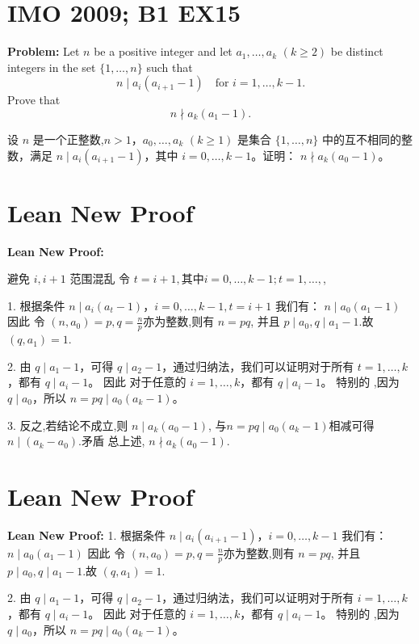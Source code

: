 \documentclass[a4paper]{article}
\begin{document}
\section*{IMO 2009; B1 EX15}
    \textbf{Problem:}
    Let $n$ be a positive integer and let $a_1,\ldots,a_k$ $(k \geq 2)$ be distinct integers in the set $\{1,\ldots,n\}$ such that 
    \[n \mid a_i(a_{i+1}-1) \quad \text{for } i = 1,\ldots,k-1.\]
    Prove that 
    \[n \nmid a_k(a_1-1).\]

    \[ \]
    设 $n$ 是一个正整数,$n > 1$，$a_0, \ldots, a_k$ $(k \geq 1)$ 是集合 $\{1, \ldots, n\}$ 中的互不相同的整数，满足
    $n \mid a_i(a_{i+1}-1)$，其中 $i = 0, \ldots, k-1$。证明：
    $n \nmid a_k(a_0-1)$。

\section*{Lean New Proof}
    \textbf{Lean New Proof:}

    避免 $i,i+1$ 范围混乱
    令 $t = i + 1,其中i = 0, \ldots, k-1; t = 1, \ldots, $,

    1. 根据条件 $n \mid a_i(a_t-1)$，$i = 0,\ldots,k-1, t = i + 1$ 我们有：
    $n \mid a_0(a_1 - 1)$ 因此 令 $(n,a_0) = p,q =\frac{n}{p}$亦为整数,则有 $n = pq$,
    并且 $p \mid a_0,q \mid a_1 - 1$.故 $(q,a_1) = 1$.
    
    2. 由 $q \mid a_1 - 1$，可得 $q \mid a_2 - 1$，通过归纳法，我们可以证明对于所有 $t = 1, \ldots, k$，都有 $q \mid a_i - 1$。
    因此 对于任意的 $i = 1, \ldots, k$，都有 $q \mid a_i - 1$。
    特别的 ,因为 $q \mid a_0$，所以 $n = pq \mid a_0(a_k - 1)$。
    
    3. 反之,若结论不成立,则 $n \mid a_k(a_0 - 1)$, 与$n = pq \mid a_0(a_k - 1)$相减可得 $n \mid (a_k - a_0)$.矛盾
    总上述, $n \nmid a_k(a_0 - 1)$.
    


\section*{Lean New Proof}
    \textbf{Lean New Proof:}
    1. 根据条件 $n \mid a_i(a_{i+1}-1)$，$i = 0,\ldots,k-1$ 我们有：
    $n \mid a_0(a_1 - 1)$ 因此 令 $(n,a_0) = p,q =\frac{n}{p}$亦为整数,则有 $n = pq$,
    并且 $p \mid a_0,q \mid a_1 - 1$.故 $(q,a_1) = 1$.
    
    2. 由 $q \mid a_1 - 1$，可得 $q \mid a_2 - 1$，通过归纳法，我们可以证明对于所有 $i = 1, \ldots, k$，都有 $q \mid a_i - 1$。
    因此 对于任意的 $i = 1, \ldots, k$，都有 $q \mid a_i - 1$。
    特别的 ,因为 $q \mid a_0$，所以 $n = pq \mid a_0(a_k - 1)$。
    
\end{document}
